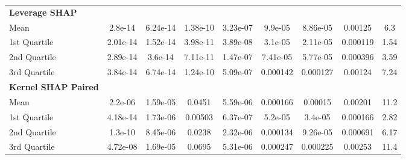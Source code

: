 {\begin{tabular} {lcccccccc}
\addlinespace[1ex] 
\textbf{Leverage SHAP} &  &  &  &  &  &  &  &  \\ 
\hspace{7pt}Mean & \cellcolor{silver!60}2.8e-14 & \cellcolor{bronze!60}6.24e-14 & \cellcolor{gold!60}1.38e-10 & \cellcolor{bronze!60}3.23e-07 & \cellcolor{gold!60}9.9e-05 & \cellcolor{gold!60}8.86e-05 & \cellcolor{gold!60}0.00125 & \cellcolor{gold!60}6.3 \\ 
\hspace{7pt}1st Quartile & \cellcolor{gold!60}2.01e-14 & \cellcolor{bronze!60}1.52e-14 & \cellcolor{bronze!60}3.98e-11 & 3.89e-08 & \cellcolor{gold!60}3.1e-05 & \cellcolor{gold!60}2.11e-05 & \cellcolor{gold!60}0.000119 & \cellcolor{gold!60}1.54 \\ 
\hspace{7pt}2nd Quartile & \cellcolor{silver!60}2.89e-14 & \cellcolor{silver!60}3.6e-14 & \cellcolor{silver!60}7.11e-11 & 1.47e-07 & \cellcolor{gold!60}7.41e-05 & \cellcolor{gold!60}5.77e-05 & \cellcolor{gold!60}0.000396 & \cellcolor{gold!60}3.59 \\ 
\hspace{7pt}3rd Quartile & \cellcolor{silver!60}3.84e-14 & \cellcolor{silver!60}6.74e-14 & \cellcolor{gold!60}1.24e-10 & 5.09e-07 & \cellcolor{gold!60}0.000142 & \cellcolor{gold!60}0.000127 & \cellcolor{gold!60}0.00124 & \cellcolor{gold!60}7.24 \\ 
\addlinespace[1ex] 
\textbf{Kernel SHAP Paired} &  &  &  &  &  &  &  &  \\ 
\hspace{7pt}Mean & 2.2e-06 & 1.59e-05 & 0.0451 & 5.59e-06 & \cellcolor{bronze!60}0.000166 & \cellcolor{bronze!60}0.00015 & \cellcolor{bronze!60}0.00201 & \cellcolor{bronze!60}11.2 \\ 
\hspace{7pt}1st Quartile & 4.18e-14 & 1.73e-06 & 0.00503 & 6.37e-07 & \cellcolor{silver!60}5.2e-05 & \cellcolor{silver!60}3.4e-05 & \cellcolor{silver!60}0.000166 & \cellcolor{bronze!60}2.82 \\ 
\hspace{7pt}2nd Quartile & 1.3e-10 & 8.45e-06 & 0.0238 & 2.32e-06 & \cellcolor{bronze!60}0.000134 & \cellcolor{bronze!60}9.26e-05 & \cellcolor{silver!60}0.000691 & \cellcolor{bronze!60}6.17 \\ 
\hspace{7pt}3rd Quartile & 4.72e-08 & 1.69e-05 & 0.0695 & 5.31e-06 & \cellcolor{bronze!60}0.000247 & \cellcolor{bronze!60}0.000225 & \cellcolor{bronze!60}0.00253 & \cellcolor{bronze!60}11.4 \\ 

\end{tabular}}
